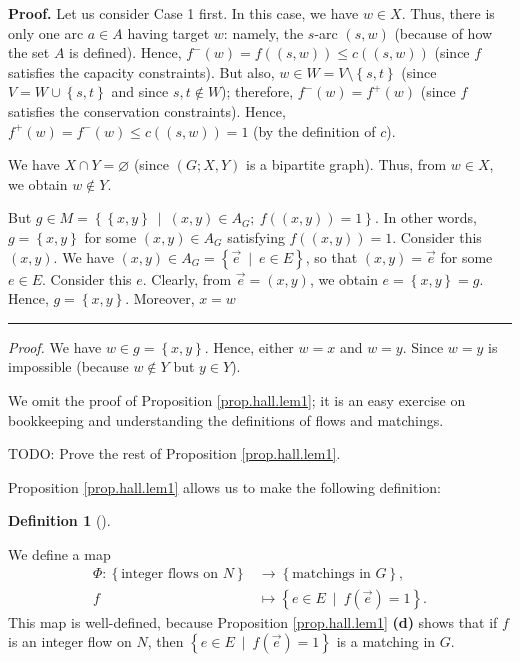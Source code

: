 \documentclass[numbers=enddot,12pt,final,onecolumn,notitlepage]{scrartcl}%
\newcounter{exer}
\theoremstyle{definition}
\newtheorem{defi}[theo]{Definition}
\newenvironment{definition}[1][]
{\begin{defi}[#1]\begin{leftbar}}
{\end{leftbar}\end{defi}}
\newenvironment{proof}[1][Proof]{\noindent\textbf{#1.} }{\ \rule{0.5em}{0.5em}}
\newenvironment{noncompile}{}{}
\begin{document}
\begin{noncompile}
\begin{proof}
Let us consider Case 1 first. In this case, we have $w\in X$. Thus, there is
only one arc $a\in A$ having target $w$: namely, the $s$-arc $\left(
s,w\right)  $ (because of how the set $A$ is defined). Hence, $f^{-}\left(
w\right)  =f\left(  \left(  s,w\right)  \right)  \leq c\left(  \left(
s,w\right)  \right)  $ (since $f$ satisfies the capacity constraints). But
also, $w\in W=V\setminus\left\{  s,t\right\}  $ (since $V=W\cup\left\{
s,t\right\}  $ and since $s,t\notin W$); therefore, $f^{-}\left(  w\right)
=f^{+}\left(  w\right)  $ (since $f$ satisfies the conservation constraints).
Hence, $f^{+}\left(  w\right)  =f^{-}\left(  w\right)  \leq c\left(  \left(
s,w\right)  \right)  =1$ (by the definition of $c$).

We have $X\cap Y=\varnothing$ (since $\left(  G;X,Y\right)  $ is a bipartite
graph). Thus, from $w\in X$, we obtain $w\notin Y$.

But $g\in M=\left\{  \left\{  x,y\right\}  \ \mid\ \left(  x,y\right)  \in
A_{G};\ f\left(  \left(  x,y\right)  \right)  =1\right\}  $. In other words,
$g=\left\{  x,y\right\}  $ for some $\left(  x,y\right)  \in A_{G}$ satisfying
$f\left(  \left(  x,y\right)  \right)  =1$. Consider this $\left(  x,y\right)
$. We have $\left(  x,y\right)  \in A_{G}=\left\{  \overrightarrow{e}%
\ \mid\ e\in E\right\}  $, so that $\left(  x,y\right)  =\overrightarrow{e}$
for some $e\in E$. Consider this $e$. Clearly, from $\overrightarrow{e}%
=\left(  x,y\right)  $, we obtain $e=\left\{  x,y\right\}  =g$. Hence,
$g=\left\{  x,y\right\}  $. Moreover, $x=w$\ \ \ \ 
\end{proof}

\textit{Proof.} We have $w\in g=\left\{  x,y\right\}  $. Hence, either $w=x$
and $w=y$. Since $w=y$ is impossible (because $w\notin Y$ but $y\in Y$).
\end{noncompile}

We omit the proof of Proposition \ref{prop.hall.lem1}; it is an easy exercise
on bookkeeping and understanding the definitions of flows and matchings.

TODO: Prove the rest of Proposition \ref{prop.hall.lem1}.

Proposition \ref{prop.hall.lem1} allows us to make the following definition:

\begin{definition}
We define a map%
\begin{align*}
\Phi:\left\{  \text{integer flows on }N\right\}   &  \rightarrow\left\{
\text{matchings in }G\right\}  ,\\
f  &  \mapsto\left\{  e\in E\ \mid\ f\left(  \overrightarrow{e}\right)
=1\right\}  .
\end{align*}
This map is well-defined, because Proposition \ref{prop.hall.lem1}
\textbf{(d)} shows that if $f$ is an integer flow on $N$, then $\left\{  e\in
E\ \mid\ f\left(  \overrightarrow{e}\right)  =1\right\}  $ is a matching in
$G$.
\end{definition}
\end{document}

